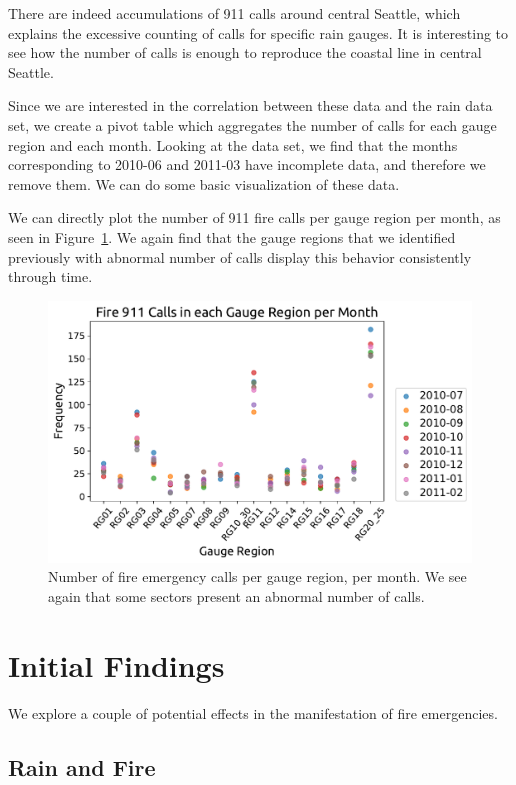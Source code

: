\documentclass[12pt,a4paper]{article}
\begin{document}
There are indeed accumulations of 911 calls around central Seattle, which explains the excessive counting of calls for specific rain gauges. It is interesting to see how the number of calls is enough to reproduce the coastal line in central Seattle.

Since we are interested in the correlation between these data and the rain data set, we create a pivot table which aggregates the number of calls for each gauge region and each month. Looking at the data set, we find that the months corresponding to 2010-06 and 2011-03 have incomplete data, and therefore we remove them. We can do some basic visualization of these data.

We can directly plot the number of 911 fire calls per gauge region per month, as seen in Figure~\ref{CallsGaugeMonth}. We again find that the gauge regions that we identified previously with abnormal number of calls display this behavior consistently through time.

\begin{figure}[ht!]
\centering
\includegraphics[scale=0.65]{figs/CallsGaugeMonth.pdf}
\caption{Number of fire emergency calls per gauge region, per month. We see again that some sectors present an abnormal number of calls.}
\label{CallsGaugeMonth}
\end{figure}


\section{Initial Findings}

We explore a couple of potential effects in the manifestation of fire emergencies.

\subsection{Rain and Fire}
\end{document}
